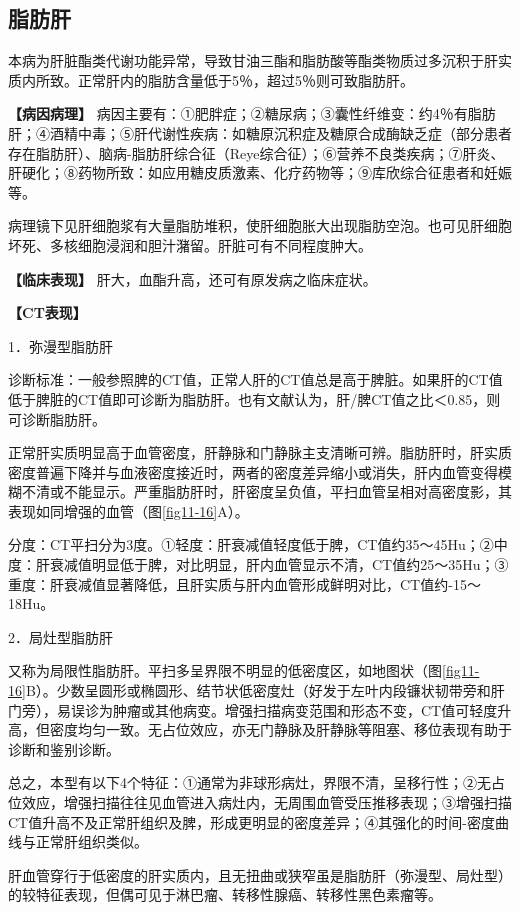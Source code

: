 \subsection{脂肪肝}

本病为肝脏酯类代谢功能异常，导致甘油三酯和脂肪酸等酯类物质过多沉积于肝实质内所致。正常肝内的脂肪含量低于5％，超过5％则可致脂肪肝。

\textbf{【病因病理】}
病因主要有：①肥胖症；②糖尿病；③囊性纤维变：约4％有脂肪肝；④酒精中毒；⑤肝代谢性疾病：如糖原沉积症及糖原合成酶缺乏症（部分患者存在脂肪肝）、脑病-脂肪肝综合征（Reye综合征）；⑥营养不良类疾病；⑦肝炎、肝硬化；⑧药物所致：如应用糖皮质激素、化疗药物等；⑨库欣综合征患者和妊娠等。

病理镜下见肝细胞浆有大量脂肪堆积，使肝细胞胀大出现脂肪空泡。也可见肝细胞坏死、多核细胞浸润和胆汁潴留。肝脏可有不同程度肿大。

\textbf{【临床表现】} 肝大，血酯升高，还可有原发病之临床症状。

\textbf{【CT表现】}

1．弥漫型脂肪肝

诊断标准：一般参照脾的CT值，正常人肝的CT值总是高于脾脏。如果肝的CT值低于脾脏的CT值即可诊断为脂肪肝。也有文献认为，肝/脾CT值之比＜0.85，则可诊断脂肪肝。

正常肝实质明显高于血管密度，肝静脉和门静脉主支清晰可辨。脂肪肝时，肝实质密度普遍下降并与血液密度接近时，两者的密度差异缩小或消失，肝内血管变得模糊不清或不能显示。严重脂肪肝时，肝密度呈负值，平扫血管呈相对高密度影，其表现如同增强的血管（图\ref{fig11-16}A）。

分度：CT平扫分为3度。①轻度：肝衰减值轻度低于脾，CT值约35～45Hu；②中度：肝衰减值明显低于脾，对比明显，肝内血管显示不清，CT值约25～35Hu；③重度：肝衰减值显著降低，且肝实质与肝内血管形成鲜明对比，CT值约-15～18Hu。

2．局灶型脂肪肝

又称为局限性脂肪肝。平扫多呈界限不明显的低密度区，如地图状（图\ref{fig11-16}B）。少数呈圆形或椭圆形、结节状低密度灶（好发于左叶内段镰状韧带旁和肝门旁），易误诊为肿瘤或其他病变。增强扫描病变范围和形态不变，CT值可轻度升高，但密度均匀一致。无占位效应，亦无门静脉及肝静脉等阻塞、移位表现有助于诊断和鉴别诊断。

总之，本型有以下4个特征：①通常为非球形病灶，界限不清，呈移行性；②无占位效应，增强扫描往往见血管进入病灶内，无周围血管受压推移表现；③增强扫描CT值升高不及正常肝组织及脾，形成更明显的密度差异；④其强化的时间-密度曲线与正常肝组织类似。

肝血管穿行于低密度的肝实质内，且无扭曲或狭窄虽是脂肪肝（弥漫型、局灶型）的较特征表现，但偶可见于淋巴瘤、转移性腺癌、转移性黑色素瘤等。

